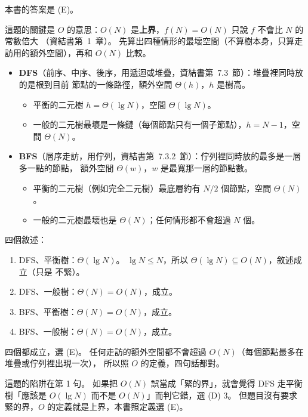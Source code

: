 \begin{pastsoln}
本書的答案是 (E)。

這題的關鍵是 $O$ 的意思：$O(N)$ 是\textbf{上界}，$f(N) = O(N)$ 只說 $f$ 不會比 $N$ 的常數倍大
（資結書第~1~章）。 先算出四種情形的最壞空間（不算樹本身，只算走訪用的額外空間），再和 $O(N)$
比較。

\begin{itemize}
\item \textbf{DFS}（前序、中序、後序，用遞迴或堆疊，資結書第~7.3~節）：堆疊裡同時放的是根到目前
節點的一條路徑，額外空間 $\Theta(h)$，$h$ 是樹高。
\begin{itemize}
\item 平衡的二元樹 $h = \Theta(\lg N)$，空間 $\Theta(\lg N)$。
\item 一般的二元樹最壞是一條鏈（每個節點只有一個子節點），$h = N - 1$，空間 $\Theta(N)$。
\end{itemize}
\item \textbf{BFS}（層序走訪，用佇列，資結書第~7.3.2~節）：佇列裡同時放的最多是一層多一點的節點，
額外空間 $\Theta(w)$，$w$ 是最寬那一層的節點數。
\begin{itemize}
\item 平衡的二元樹（例如完全二元樹）最底層約有 $N/2$ 個節點，空間 $\Theta(N)$。
\item 一般的二元樹最壞也是 $\Theta(N)$；任何情形都不會超過 $N$ 個。
\end{itemize}
\end{itemize}

四個敘述：
\begin{enumerate}
\item DFS、平衡樹：$\Theta(\lg N)$。 $\lg N \le N$，所以 $\Theta(\lg N) \subseteq O(N)$，敘述成立（只是
不緊）。
\item DFS、一般樹：$\Theta(N) = O(N)$，成立。
\item BFS、平衡樹：$\Theta(N) = O(N)$，成立。
\item BFS、一般樹：$\Theta(N) = O(N)$，成立。
\end{enumerate}
四個都成立，選 (E)。 任何走訪的額外空間都不會超過 $O(N)$（每個節點最多在堆疊或佇列裡出現一次），
所以照 $O$ 的定義，四句話都對。

這題的陷阱在第 1 句。 如果把 $O(N)$ 誤當成「緊的界」，就會覺得 DFS 走平衡樹「應該是 $O(\lg N)$
而不是 $O(N)$」而判它錯，選 (D) 3。 但題目沒有要求緊的界，$O$ 的定義就是上界，本書照定義選 (E)。
\end{pastsoln}
